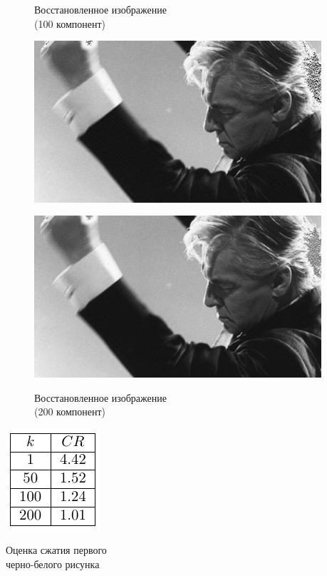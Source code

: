 \documentclass[a4paper]{article}
\begin{document}
\begin{figure}[H]
\centering
    \begin{minipage}{.5\textwidth}
    \centering
    \caption{Восстановленное изображение \\(100 компонент)}
    \includegraphics[width = 0.95\textwidth]{reconstructions/with_100comps_Herbert_von_Karajan.jpg}
    \label{fig:hvk_100}
    \end{minipage}%
    \begin{minipage}{.5\textwidth}
    \caption{Восстановленное изображение \\(200 компонент)}
    \includegraphics[width = 0.95\textwidth]{reconstructions/with_200comps_Herbert_von_Karajan.jpg}
    \label{fig:hvk_200}
    \end{minipage}%
\end{figure}
\begin{table}[H]
    \centering
    \includegraphics[]{tables/CR_for_Herbert_von_Karajan.pdf}
    \caption{Оценка сжатия первого\\черно-белого рисунка}
    \label{tab:hvk}
\end{table}
\newpage
\end{document}
